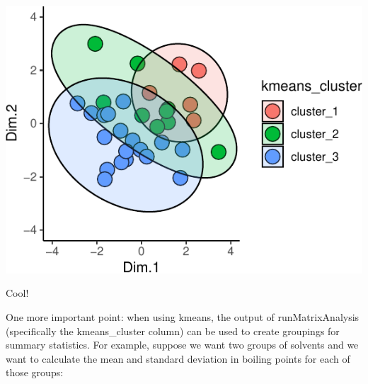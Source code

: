 \documentclass[
]{krantz}
\begin{document}
\begin{center}\includegraphics[width=1\linewidth]{index_files/figure-latex/unnamed-chunk-110-1} \end{center}

Cool!

One more important point: when using kmeans, the output of runMatrixAnalysis (specifically the kmeans\_cluster column) can be used to create groupings for summary statistics. For example, suppose we want two groups of solvents and we want to calculate the mean and standard deviation in boiling points for each of those groups:
\end{document}

